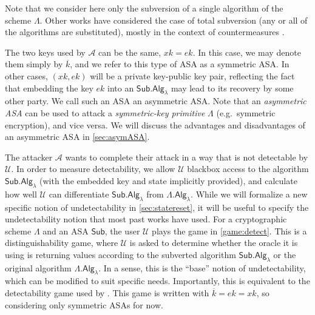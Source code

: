 Note that we consider here only the subversion of a single algorithm of the scheme $\Lambda$. Other works have considered the case of total subversion (any or all of the algorithms are substituted), mostly in the context of countermeasures \cite{ACNS:AFMV19,CCS:RTYZ17,AC:RTYZ16}.

The two keys used by $\mathcal{A}$ can be the same, $xk=ek$. In this case, we may denote them simply by $\overline{k}$, and we refer to this type of ASA as a symmetric ASA. In other cases, $(xk,ek)$ will be a private key-public key pair, reflecting the fact that embedding the key $ek$ into an $\mathsf{Sub.Alg}_\lambda$ may lead to its recovery by some other party. We call such an ASA an asymmetric ASA. Note that an \emph{asymmetric ASA} can be used to attack a \emph{symmetric-key primitive} $\mathsf{\Lambda}$ (e.g.\ symmetric encryption), and vice versa. We will discuss the advantages and disadvantages of an asymmetric ASA in \autoref{sec:asymASA}.

The attacker $\mathcal{A}$ wants to complete their attack in a way that is not detectable by $\mathcal{U}$. In order to measure detectability, we allow $\mathcal{U}$ blackbox access to the algorithm $\mathsf{Sub.Alg}_\lambda$ (with the embedded key and state implicitly provided), and calculate how well $\mathcal{U}$ can differentiate $\mathsf{Sub.Alg}_\lambda$ from $\mathsf{\Lambda.Alg}_\lambda$. While we will formalize a new specific notion of undetectability in \autoref{sec:statereset}, it will be useful to specify the undetectability notion that most past works have used. For a cryptographic scheme $\Lambda$ and an ASA $\mathsf{Sub}$, the user $\mathcal{U}$ plays the game in \autoref{game:detect}. This is a distinguishability game, where $\mathcal{U}$ is asked to determine whether the oracle it is using is returning values according to the subverted algorithm $\mathsf{Sub.Alg}_\lambda$ or the original algorithm $\mathsf{\Lambda.Alg}_\lambda$. In a sense, this is the ``base'' notion of undetectability, which can be modified to suit specific needs. Importantly, this is equivalent to the detectability game used by \cite{C:BelPatRog14}. This game is written with $\overline{k}=ek=xk$, so considering only symmetric ASAs for now.


